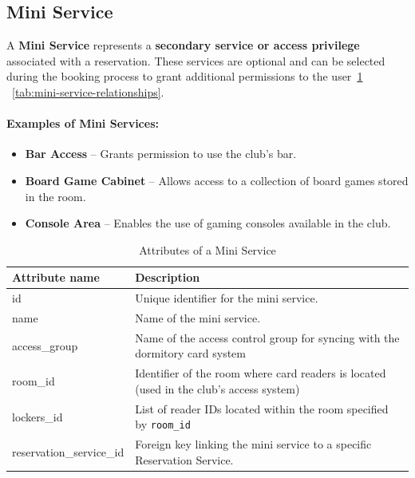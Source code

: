 \subsection{Mini Service}

A \textbf{Mini Service} represents a \textbf{secondary service or access privilege} associated with a reservation. These services are optional and can be selected during the booking process to grant additional permissions to the user~\ref{tab:mini-service-attributes} ~\ref{tab:mini-service-relationships}.

\paragraph{Examples of Mini Services:}
\begin{itemize}
	\item \textbf{Bar Access} – Grants permission to use the club’s bar.
	\item \textbf{Board Game Cabinet} – Allows access to a collection of board games stored in the room.
	\item \textbf{Console Area} – Enables the use of gaming consoles available in the club.
\end{itemize}

\begin{table}[H]
  \centering
  \begin{tabularx}{\textwidth}{|l|X|}
  \hline
  \textbf{Attribute name} & \textbf{Description} \\
  \hline
  id & Unique identifier for the mini service. \\
  \hline
  name & Name of the mini service. \\
  \hline
  access\_group & Name of the access control group for syncing with the dormitory card system \\
  \hline
  room\_id & Identifier of the room where card readers is located (used in the club's access system) \\
  \hline
  lockers\_id & List of reader IDs located within the room specified by \texttt{room\_id} \\
  \hline
  reservation\_service\_id & Foreign key linking the mini service to a specific Reservation Service. \\
  \hline
  \end{tabularx}
  \caption{Attributes of a Mini Service}
  \label{tab:mini-service-attributes}
  \end{table}
  
